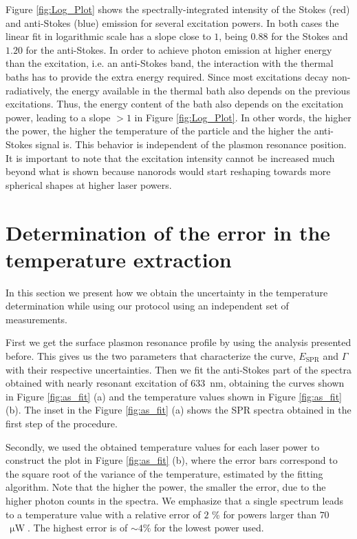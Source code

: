 \documentclass[journal=nalefd,manuscript=letter]{achemso}
\newcommand{\nm}{\ensuremath{\,\textrm{nm}}}
\newcommand{\uW}{\ensuremath{\,\upmu\textrm{W}}}
\begin{document}
Figure \ref{fig:Log_Plot} shows the spectrally-integrated intensity of the Stokes (red) and
anti-Stokes (blue) emission for several excitation powers. In both cases the
linear fit in logarithmic scale has a slope close to $1$, being $0.88$ for the
Stokes and $1.20$ for the anti-Stokes. 
In order to achieve photon emission at higher energy than the excitation, 
i.e. an anti-Stokes band, the interaction with the thermal baths 
has to provide the extra energy required. Since most 
excitations decay non-radiatively, the energy available in the thermal bath 
also depends on the previous excitations. Thus, the energy content of the 
bath also depends on the excitation power, leading
to a slope $>1$ in Figure \ref{fig:Log_Plot}. In other words, the higher the power, 
the higher the temperature of the particle and the higher the anti-Stokes signal is. 
This behavior is independent of the plasmon resonance position. 
It is important to note that the excitation intensity cannot
be increased much beyond what is shown because nanorods would start reshaping
towards more spherical shapes at higher laser powers.



\pagebreak
\section{Determination of the error in the temperature extraction}\label{sec:discussion_errors} 

In this section we present how we obtain the uncertainty in the temperature determination
while using our protocol using an independent set of measurements.

First we get the surface plasmon resonance profile by using the analysis presented before.
This gives us the two parameters that characterize the curve, $E_\textrm{SPR}$ and $\Gamma$
with their respective uncertainties. Then we fit the anti-Stokes part of the spectra obtained with 
nearly resonant excitation of $633$ \nm, obtaining the curves shown in Figure \ref{fig:as_fit} (a) and
the temperature values shown in Figure \ref{fig:as_fit}(b). 
The inset in the Figure \ref{fig:as_fit} (a) shows the SPR spectra obtained in the first step of the procedure. 

Secondly, we used the obtained temperature values for each laser power to construct the plot in Figure 
\ref{fig:as_fit} (b), where the error bars correspond to the square root of the variance of 
the temperature, estimated by the fitting algorithm.
Note that the higher the power, the smaller the error, due to the higher photon counts in 
the spectra. We emphasize that a single spectrum leads to a temperature value with a 
relative error of $2$ \% for powers larger than $70$ \uW. The highest error is of $\sim 4\%$ for the 
lowest power used. 
\end{document}
